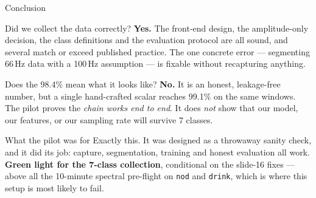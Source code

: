 \documentclass[aspectratio=169,10pt]{beamer}
\begin{document}
\begin{frame}{Conclusion}
\begin{block}{\small Did we collect the data correctly?}
\footnotesize
\textbf{Yes.} The front-end design, the amplitude-only decision, the class definitions and the
evaluation protocol are all sound, and several match or exceed published practice.
The one concrete error --- segmenting 66\,Hz data with a 100\,Hz assumption --- is fixable
without recapturing anything.
\end{block}

\vspace{0.2em}
\begin{block}{\small Does the 98.4\% mean what it looks like?}
\footnotesize
\textbf{No.} It is an honest, leakage-free number, but a single hand-crafted scalar reaches
99.1\% on the same windows. The pilot proves the \emph{chain works end to end}.
It does \emph{not} show that our model, our features, or our sampling rate will
survive 7 classes.
\end{block}

\vspace{0.2em}
\begin{block}{\small What the pilot was for}
\footnotesize
Exactly this. It was designed as a throwaway sanity check, and it did its job:
capture, segmentation, training and honest evaluation all work.
\textbf{Green light for the 7-class collection}, conditional on the slide-16 fixes ---
above all the 10-minute spectral pre-flight on \texttt{nod} and \texttt{drink},
which is where this setup is most likely to fail.
\end{block}
\end{frame}
\end{document}
